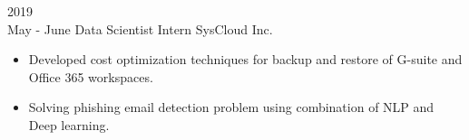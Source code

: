 \documentclass[10pt]{developercv} %
\begin{document}
\begin{entrylist}
{\begin{itemize}[noitemsep,topsep=0pt,parsep=0pt,partopsep=0pt, leftmargin=-1pt]
        \end{itemize}
    }
    \entry
    {2019\\\footnotesize{May - June}}
    {Data Scientist Intern}
    {SysCloud Inc.}
    {\vspace{-7pt}
    \small
        \begin{itemize}[noitemsep,topsep=0pt,parsep=0pt,partopsep=0pt, leftmargin=-1pt]
            \item Developed cost optimization techniques for backup and restore of G-suite and Office 365 workspaces.
            \item Solving phishing email detection problem using combination of NLP and Deep learning.
        \end{itemize}
    }
\end{entrylist}


\vspace{-15 pt}
\end{document}
